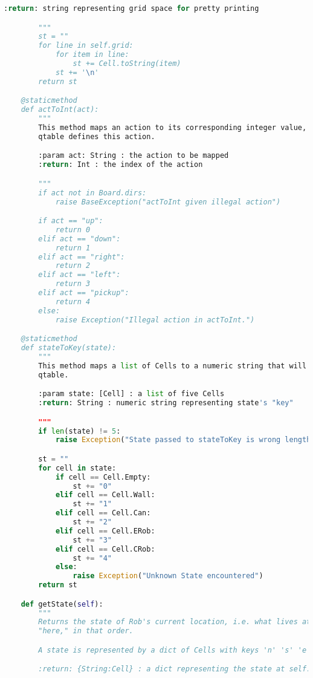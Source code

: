 \documentclass[12pt,a4paper]{article}
\begin{document}
\begin{lstlisting}[language=Python,numbers=none,basicstyle=\tiny]
        :return: string representing grid space for pretty printing

        """
        st = ""
        for line in self.grid:
            for item in line:
                st += Cell.toString(item)
            st += '\n'
        return st

    @staticmethod
    def actToInt(act):
        """
        This method maps an action to its corresponding integer value, i.e. which column in the
        qtable defines this action.

        :param act: String : the action to be mapped
        :return: Int : the index of the action

        """
        if act not in Board.dirs:
            raise BaseException("actToInt given illegal action")

        if act == "up":
            return 0
        elif act == "down":
            return 1
        elif act == "right":
            return 2
        elif act == "left":
            return 3
        elif act == "pickup":
            return 4
        else:
            raise Exception("Illegal action in actToInt.")

    @staticmethod
    def stateToKey(state):
        """
        This method maps a list of Cells to a numeric string that will represent it in the
        qtable.

        :param state: [Cell] : a list of five Cells
        :return: String : numeric string representing state's "key"

        """
        if len(state) != 5:
            raise Exception("State passed to stateToKey is wrong length!")

        st = ""
        for cell in state:
            if cell == Cell.Empty:
                st += "0"
            elif cell == Cell.Wall:
                st += "1"
            elif cell == Cell.Can:
                st += "2"
            elif cell == Cell.ERob:
                st += "3"
            elif cell == Cell.CRob:
                st += "4"
            else:
                raise Exception("Unknown State encountered")
        return st

    def getState(self):
        """
        Returns the state of Rob's current location, i.e. what lives at north, south, east, west, and
        "here," in that order.

        A state is represented by a dict of Cells with keys 'n' 's' 'e' 'w' and 'h'.

        :return: {String:Cell} : a dict representing the state at self.location


\end{lstlisting}
\end{document}

